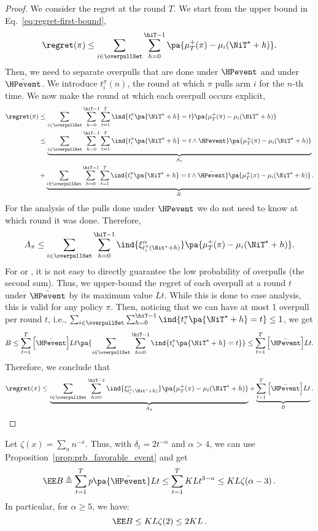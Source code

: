 \begin{proof}
We consider the regret at the round $T$. We start from the upper bound in Eq.~\ref{eq:regret-first-bound}, 
\begin{equation}
\regret(\pi) \leq \sum_{i\in \overpullSet}   \sum_{h=0}^{\hiT-1} \pa{\mu^+_T(\pi) - \mu_i(\NiT^{\star} + h)}.
\end{equation}
Then, we need to separate overpulls that are done under $\HPevent$ and under $\bar{\HPevent}$. We introduce $t_i^{\pi}(n)$, the round at which $\pi$ pulls arm $i$ for the $n$-th time. We now make the round at which each overpull occurs  explicit,
\begin{align*}
\regret(\pi) & \leq \sum_{i\in \overpullSet}   \sum_{h=0}^{\hiT-1} \sum_{t=1}^T \ind{ t_i^{\pi}\pa{\NiT^{\star} + h} = t } \pa{\mu^+_T(\pi) - \mu_i(\NiT^{\star} + h)}\\
& \leq \underbrace{\sum_{i\in \overpullSet}   \sum_{h=0}^{\hiT-1} \sum_{t=1}^T \ind{ t_i^{\pi}\pa{\NiT^{\star} + h} = t \land \HPevent } \pa{\mu^+_T(\pi) - \mu_i(\NiT^{\star} + h)}}_{A_\pi}\\
&+ \underbrace{\sum_{i\in \overpullSet}\sum_{h=0}^{\hiT-1} \sum_{t=1}^T \ind{ t_i^{\pi}\pa{\NiT^{\star} + h} = t \land \bar{\HPevent} }\pa{\mu^+_T(\pi) - \mu_i(\NiT^{\star} + h)}}_B.
\end{align*}
For the analysis of the pulls done under $\HPevent$ we do not need to know at which round it was done. Therefore, 
\[
A_\pi \leq \sum_{i\in \overpullSet}   \sum_{h=0}^{\hiT-1}  \ind{ \xi^\alpha_{t_i^\pi(\Nit^\star + h)} } \pa{\mu^+_T(\pi) - \mu_i(\NiT^{\star} + h)}.
\]
For \FEWA or \RUCB, it is not easy to directly guarantee the low probability of overpulls (the second sum). Thus, we upper-bound the regret of each overpull at a round $t$ under $\bar{\HPevent}$ by its maximum value $Lt$. While this is done to ease \myAlgorithm analysis, this is valid for any policy $\pi$. Then, noticing that we can have at most 1 overpull per round $t$, i.e., $\sum_{i\in \overpullSet}\sum_{h=0}^{\hiT-1}\ind{ t_i^{\pi}\pa{\NiT^{\star} + h} = t  } \leq 1$, we get
\[
B \leq  \sum_{t=1}^T \Big[\bar{\HPevent}\Big] Lt\pa{\sum_{i\in \overpullSet}\sum_{h=0}^{\hiT-1}\ind{ t_i^{\pi}\pa{\NiT^{\star} + h} = t  }} \leq  \sum_{t=1}^T \Big[\bar{\HPevent}\Big] Lt.
\]
Therefore, we conclude that
\[
\regret(\pi) \leq \underbrace{\sum_{i\in \overpullSet} \sum_{h=0}^{\hiT-1} \ind{ \xi^\alpha_{t_i^\pi(\Nit^\star + h)} }\pa{\mu^+_T(\pi) - \mu_i(\NiT^{\star} + h)}}_{A_{\pi}} + \underbrace{\sum_{t=1}^T \Big[\bar{\HPevent}\Big] Lt}_B. 
\]
\end{proof}
\begin{lemma}
\label{lem:rested-B}
Let $\zeta(x) = \sum_n n^{-x}$. Thus, with $\delta_t = 2t^{-\alpha}$ and $\alpha > 4$, we can use Proposition~\ref{prop:prb_favorable_event} and get
\[
\EE B \triangleq \sum_{t=1}^T p\pa{\bar{\HPevent}}Lt \leq \sum_{t=1}^T KLt^{3-\alpha}\leq KL \zeta(\alpha -3)\, .
\]
In particular, for $\alpha \geq 5$, we have:
\[
\EE B \leq KL\zeta(2) \leq 2KL\, .
\]
\end{lemma}

